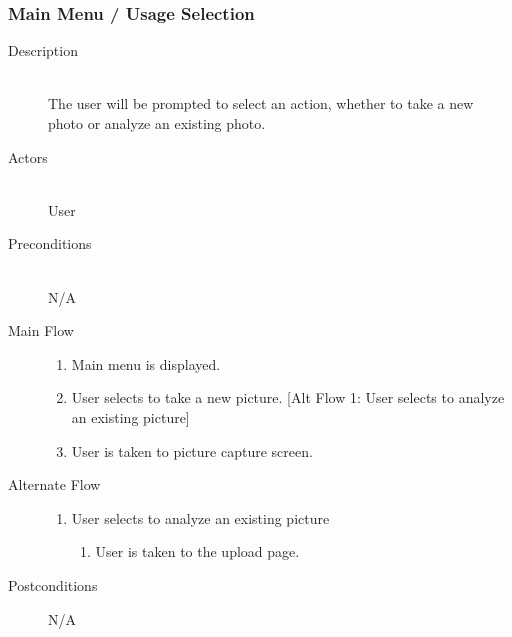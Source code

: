 \subsubsection{Main Menu / Usage Selection}
\begin{description}
    \item[Description] \hfill \\
        The user will be prompted to select an action, whether to take a new photo or analyze an existing photo.
    \item[Actors] \hfill \\
        User
    \item[Preconditions] \hfill \\
            N/A
    \item[Main Flow] \hfill 
        \begin{enumerate}
            \item Main menu is displayed.
            \item User selects to take a new picture.
                [Alt Flow 1: User selects to analyze an existing picture]
            \item User is taken to picture capture screen.
        \end{enumerate}
    \item[Alternate Flow] \hfill 
        \begin{enumerate}
            \item User selects to analyze an existing picture
                \begin{enumerate}
                    \item User is taken to the upload page.
                \end{enumerate}
        \end{enumerate}
    \item[Postconditions]
        N/A
\end{description}
\myspace

